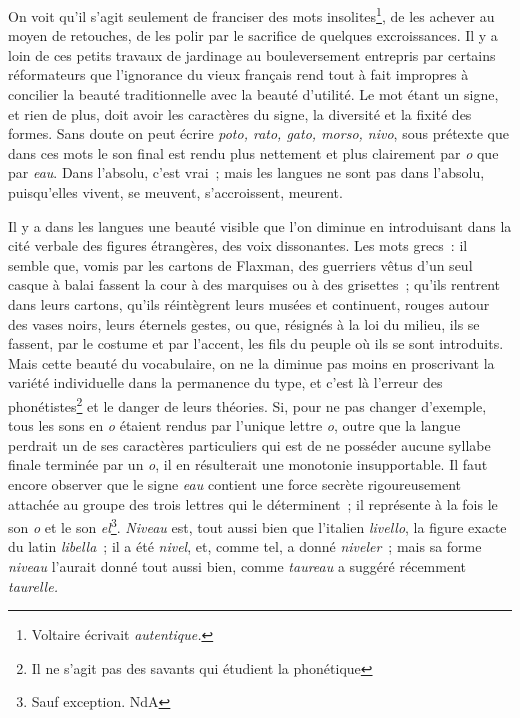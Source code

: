 \documentclass[french,twoside]{book} %
\begin{document}
\noindent On voit qu’il s’agit seulement de franciser des mots insolites\footnote{Voltaire écrivait {\itshape autentique.}}, de les achever au moyen de retouches, de les polir par le sacrifice de quelques excroissances. Il y a loin de ces petits travaux de jardinage au bouleversement entrepris par certains réformateurs que l’ignorance du vieux français rend tout à fait impropres à concilier la beauté traditionnelle avec la beauté d’utilité. Le mot étant un signe, et rien de plus, doit avoir les caractères du signe, la diversité et la fixité des formes. Sans doute on peut écrire {\itshape poto, rato, gato, morso, nivo}, sous prétexte que dans ces mots le son final est rendu plus nettement et plus clairement par {\itshape o} que par {\itshape eau}. Dans l’absolu, c’est vrai ; mais les langues ne sont pas dans l’absolu, puisqu’elles vivent, se meuvent, s’accroissent, meurent.\par
Il y a dans les langues une beauté visible que l’on diminue en introduisant dans la cité verbale des figures étrangères, des voix dissonantes. Les mots grecs : il semble que, vomis par les cartons de Flaxman, des guerriers vêtus d’un seul casque à balai fassent la cour à des marquises ou à des grisettes ; qu’ils rentrent dans leurs cartons, qu’ils réintègrent leurs musées et continuent, rouges autour des vases noirs, leurs éternels gestes, ou que, résignés à la loi du milieu, ils se fassent, par le costume et par l’accent, les fils du peuple où ils se sont introduits. Mais cette beauté du vocabulaire, on ne la diminue pas moins en proscrivant la variété individuelle dans la permanence du type, et c’est là l’erreur des phonétistes\footnote{Il ne s’agit pas des savants qui étudient la phonétique} et le danger de leurs théories. Si, pour ne pas changer d’exemple, tous les sons en {\itshape o} étaient rendus par l’unique lettre {\itshape o}, outre que la langue perdrait un de ses caractères particuliers qui est de ne posséder aucune syllabe finale terminée par un {\itshape o}, il en résulterait une monotonie insupportable. Il faut encore observer que le signe {\itshape eau} contient une force secrète rigoureusement attachée au groupe des trois lettres qui le déterminent ; il représente à la fois le son {\itshape o} et le son {\itshape el}\footnote{Sauf exception. NdA}. {\itshape Niveau} est, tout aussi bien que l’italien {\itshape livello}, la figure exacte du latin {\itshape libella} ; il a été {\itshape nivel}, et, comme tel, a donné {\itshape niveler} ; mais sa forme {\itshape niveau} l’aurait donné tout aussi bien, comme {\itshape taureau} a suggéré récemment {\itshape taurelle.}\par
\end{document}
